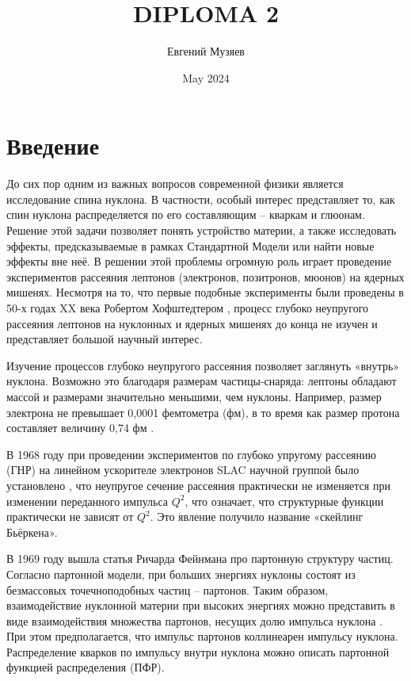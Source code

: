 \documentclass{extarticle}
\title{DIPLOMA 2}
\author{Евгений Музяев}
\date{May 2024}
\begin{document}



\newpage
\tableofcontents{\thispagestyle{empty}}
\newpage

\setcounter{page}{1}
\section*{Введение}

До сих пор одним из важных вопросов современной физики является исследование спина нуклона. В частности, особый интерес представляет то, как спин нуклона распределяется по его составляющим – кваркам и глюонам. Решение этой задачи позволяет понять устройство материи, а также исследовать эффекты, предсказываемые в рамках Стандартной Модели или найти новые эффекты вне неё. В решении этой проблемы огромную роль играет проведение экспериментов рассеяния лептонов (электронов, позитронов, мюонов) на ядерных мишенях. Несмотря на то, что первые подобные эксперименты были проведены в 50-х годах XX века Робертом Хофштедтером \cite{Hofstadter}, процесс глубоко неупругого рассеяния лептонов на нуклонных и ядерных мишенях до конца не изучен и представляет большой научный интерес.


Изучение процессов глубоко неупругого рассеяния позволяет заглянуть «внутрь» нуклона. Возможно это благодаря размерам частицы-снаряда: лептоны обладают массой и размерами значительно меньшими, чем нуклоны. Например, размер электрона не превышает 0,0001 фемтометра (фм), в то время как размер протона составляет величину 0,74 фм \cite{Hofstadter}.


В 1968 году при проведении экспериментов по глубоко упругому рассеянию (ГНР) на линейном ускорителе электронов SLAC научной группой было установлено \cite{SLAC}, что неупругое сечение рассеяния практически не изменяется при изменении переданного импульса $Q^2$, что означает, что структурные функции практически не зависят от $Q^2$. Это явление получило название «скейлинг Бьёркена».


В 1969 году вышла статья Ричарда Фейнмана про партонную структуру частиц. Согласно партонной модели, при больших энергиях нуклоны состоят из безмассовых точечноподобных частиц – партонов. Таким образом, взаимодействие нуклонной материи при высоких энергиях можно представить в виде взаимодействия множества партонов, несущих долю импульса нуклона \cite{Feynman}. При этом предполагается, что импульс партонов коллинеарен импульсу нуклона. Распределение кварков по импульсу внутри нуклона можно описать партонной функцией распределения (ПФР).
\end{document}
